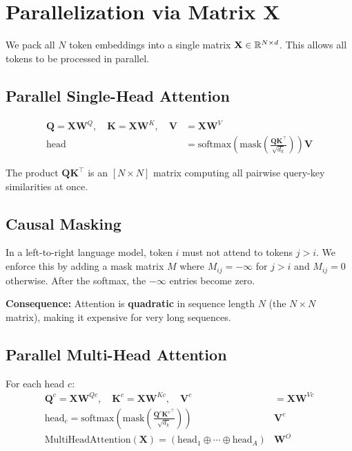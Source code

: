 \documentclass[main.tex]{subfiles}
\begin{document}
\section{Parallelization via Matrix $\mathbf{X}$}

We pack all $N$ token embeddings into a single matrix $\mathbf{X} \in \mathbb{R}^{N \times d}$. This allows all tokens to be processed in parallel.

\subsection{Parallel Single-Head Attention}

\begin{align}
\mathbf{Q} = \mathbf{X}\mathbf{W}^Q, \quad \mathbf{K} = \mathbf{X}\mathbf{W}^K, \quad \mathbf{V} &= \mathbf{X}\mathbf{W}^V \tag{8.32} \\[8pt]
\text{head} &= \text{softmax}\!\left(\text{mask}\!\left(\frac{\mathbf{Q}\mathbf{K}^\top}{\sqrt{d_k}}\right)\right) \mathbf{V} \tag{8.33}
\end{align}

The product $\mathbf{Q}\mathbf{K}^\top$ is an $[N \times N]$ matrix computing all pairwise query-key similarities at once.

\subsection{Causal Masking}

In a left-to-right language model, token $i$ must not attend to tokens $j > i$. We enforce this by adding a mask matrix $M$ where $M_{ij} = -\infty$ for $j > i$ and $M_{ij} = 0$ otherwise. After the softmax, the $-\infty$ entries become zero.

\textbf{Consequence:} Attention is \textbf{quadratic} in sequence length $N$ (the $N \times N$ matrix), making it expensive for very long sequences.

\subsection{Parallel Multi-Head Attention}

For each head $c$:
\begin{align}
\mathbf{Q}^c = \mathbf{X}\mathbf{W}^{Qc}, \quad \mathbf{K}^c = \mathbf{X}\mathbf{W}^{Kc}, \quad \mathbf{V}^c &= \mathbf{X}\mathbf{W}^{Vc} \tag{8.35} \\[6pt]
\text{head}_c = \text{softmax}\!\left(\text{mask}\!\left(\frac{\mathbf{Q}^c {\mathbf{K}^c}^\top}{\sqrt{d_k}}\right)\right) &\mathbf{V}^c \tag{8.36} \\[6pt]
\text{MultiHeadAttention}(\mathbf{X}) = \left(\text{head}_1 \oplus \cdots \oplus \text{head}_A\right) &\mathbf{W}^O \tag{8.37}
\end{align}
\end{document}
